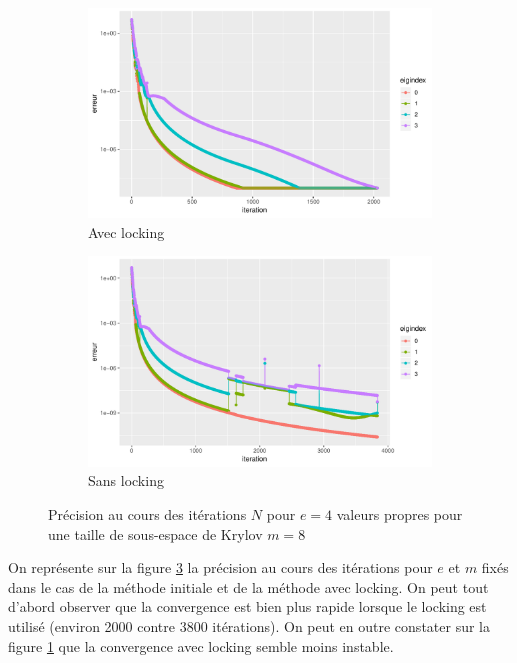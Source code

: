 \documentclass[11pt,a4paper]{article}
\begin{document}
\begin{figure}
	\centering
	\begin{subfigure}{0.49\linewidth}
		\centering
		\includegraphics[width=\linewidth, keepaspectratio]{plots/wlock_e4_p8_m8.pdf}
		\caption{Avec locking\label{wlock_e4_p8_m8}}
	\end{subfigure}
	\begin{subfigure}{0.49\linewidth}
		\centering
		\includegraphics[width=\linewidth, keepaspectratio]{plots/wolock_e4_p8_m8.pdf}
		\caption{Sans locking\label{wolock_e4_p8_m8}}
	\end{subfigure}
	\caption{Précision au cours des itérations $N$ pour $e = 4$ valeurs propres pour une taille de sous-espace de Krylov $m=8$\label{fig:comp_locks}}
\end{figure}

On représente sur la figure \ref{fig:comp_locks} la précision au cours des itérations pour $e$ et $m$ fixés dans le cas de la méthode initiale et de la méthode avec locking. On peut tout d'abord observer que la convergence est bien plus rapide lorsque le locking est utilisé (environ 2000 contre 3800 itérations). On peut en outre constater sur la figure \ref{wlock_e4_p8_m8} que la convergence avec locking semble moins instable.


% 
% 

%
\end{document}
